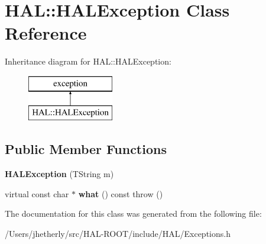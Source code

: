\hypertarget{class_h_a_l_1_1_h_a_l_exception}{\section{H\+A\+L\+:\+:H\+A\+L\+Exception Class Reference}
\label{class_h_a_l_1_1_h_a_l_exception}
}
Inheritance diagram for H\+A\+L\+:\+:H\+A\+L\+Exception\+:\begin{figure}[H]
\begin{center}
\leavevmode
\includegraphics[height=2.000000cm]{class_h_a_l_1_1_h_a_l_exception}
\end{center}
\end{figure}
\subsection*{Public Member Functions}
\begin{DoxyCompactItemize}
\item 
\hypertarget{class_h_a_l_1_1_h_a_l_exception_a4f6662db7819d278a642abc8edf6b064}{{\bfseries H\+A\+L\+Exception} (T\+String m)}\label{class_h_a_l_1_1_h_a_l_exception_a4f6662db7819d278a642abc8edf6b064}

\item 
\hypertarget{class_h_a_l_1_1_h_a_l_exception_aaf6b8a29e7bb09721dd7aaa7b7a9b078}{virtual const char $\ast$ {\bfseries what} () const   throw ()}\label{class_h_a_l_1_1_h_a_l_exception_aaf6b8a29e7bb09721dd7aaa7b7a9b078}

\end{DoxyCompactItemize}


The documentation for this class was generated from the following file\+:\begin{DoxyCompactItemize}
\item 
/\+Users/jhetherly/src/\+H\+A\+L-\/\+R\+O\+O\+T/include/\+H\+A\+L/Exceptions.\+h\end{DoxyCompactItemize}
